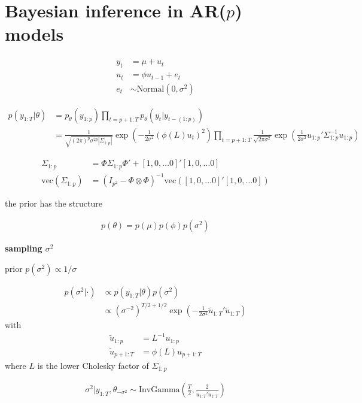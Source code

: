 
\chapter{Bayesian inference in AR($p$) models}

\begin{align}
y_t &= \mu + u_t \\
u_t &= \phi u_{t-1} + e_t \\
e_t &\sim \mathrm{Normal}(0, \sigma^2)
\end{align}

\begin{align}
p(y_{1:T}|\theta) &= p_\theta(y_{1:p}) \prod_{t=p+1:T} p_\theta(y_t|y_{t-(1:p)}) \\
&= \frac{1}{\sqrt{(2\pi)^p\sigma^{2p}|\Sigma_{1:p}|}} \exp\left(-\frac{1}{2\sigma^2}(\phi(L)u_t)^2\right)  \prod_{t=p+1:T} \frac{1}{\sqrt{2\pi\sigma^2}} \exp\left(\frac{1}{2\sigma^2}u_{1:p}'\Sigma_{1:p}^{-1}u_{1:p}\right)
\end{align}

\begin{align}
\Sigma_{1:p} &= \Phi \Sigma_{1:p} \Phi' + [1, 0, \dots 0]' [1, 0, \dots 0] \\
\mathrm{vec}(\Sigma_{1:p}) &= (I_{p^2} -\Phi \otimes \Phi)^{-1} \mathrm{vec}([1, 0, \dots 0]' [1, 0, \dots 0])
\end{align}

the prior has the structure

\begin{align}
p(\theta) = p(\mu)p(\phi)p(\sigma^2)
\end{align}

\textbf{sampling $\sigma^2$}

prior $p(\sigma^2) \propto 1/\sigma$

\begin{align}
p(\sigma^2|\cdot) &\propto p(y_{1:T}|\theta) p(\sigma^2) \\
&\propto (\sigma^{-2})^{T/2+1/2} \exp\left(-\frac{1}{2\sigma^2}\tilde{u}_{1:T}'\tilde{u}_{1:T}\right)
\end{align}
with
\begin{align}
\tilde{u}_{1:p} &= L^{-1} u_{1:p} \\
\tilde{u}_{p+1:T} &= \phi(L) u_{p+1:T}
\end{align}
where $L$ is the lower Cholesky factor of $\Sigma_{1:p}$

\begin{align}
\sigma^2|y_{1:T}, \theta_{-\sigma^2} \sim \mathrm{InvGamma}\left(\frac{T}{2}, \frac{2}{\tilde{u}_{1:T}'\tilde{u}_{1:T}}\right)
\end{align}

